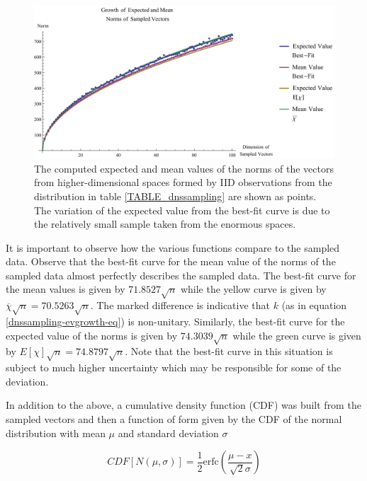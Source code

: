 \documentclass[12pt]{report}
\theoremstyle{remark}
\theoremstyle{definition}
\theoremstyle{definition}
\theoremstyle{definition}
\begin{document}
\begin{figure}
\centering
\includegraphics[width=\textwidth]{figures/dnssampling-ev_growth.pdf}
\caption[Growth of Expected and Mean Norms of Sampled Vectors]{The computed
expected and mean values of the norms of the vectors from higher-dimensional
spaces formed by IID observations from the distribution in table
\ref{TABLE_dnssampling} are shown as points. The variation of the expected value from the best-fit
curve is due to the relatively small sample taken from the enormous spaces.}
\label{dnssampling-evgrowth}
\end{figure}

It is important to observe how the various functions compare to the sampled
data. Observe that the best-fit curve for the mean value of the norms of the
sampled data almost perfectly describes the sampled data. The best-fit curve for
the mean values is given by $71.8527\sqrt{n}$ while the yellow curve is given by
$\overline{\chi}\sqrt{n}=70.5263\sqrt{n}$. The marked difference is indicative that $k$ (as in equation
\ref{dnssampling-evgrowth-eq}) is non-unitary. Similarly, the best-fit curve for
the expected value of the norms is given by $74.3039\sqrt{n}$ while the green
curve is given by $E[\chi]\sqrt{n}=74.8797\sqrt{n}$. Note that the best-fit curve in this
situation is subject to much higher uncertainty which may be responsible for
some of the deviation.

In addition to the above, a cumulative density function (CDF) was built from the
sampled vectors and then a function of form given by the CDF of the normal
distribution with mean $\mu$ and standard deviation $\sigma$

\begin{equation}
CDF[N(\mu,\sigma)]=\frac{1}{2} \text{erfc}\left(\frac{\mu -x}{\sqrt{2} \sigma}\right)
\end{equation}
\end{document}

